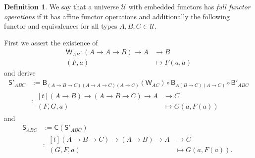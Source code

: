 \documentclass[a4paper]{article}
\theoremstyle{definition}
\newtheorem{definition}{Definition}[section]
\theoremstyle{remark}
\newcommand{\defn}{\emph}
\newcommand{\U}{\mathcal{U}}
\newcommand{\nm}{\mathsf}
\newcommand{\combinator}{\nm}
\newcommand{\compFun}{\combinator{B'}}
\newcommand{\revCompFun}{\combinator{B}}
\newcommand{\swapFun}{\combinator{C}}
\newcommand{\dupFun}{\combinator{W}}
\newcommand{\substFun}{\combinator{S'}}
\newcommand{\revSubstFun}{\combinator{S}}
\begin{document}
\begin{definition}
  We say that a universe $\U$ with embedded functors has \defn{full functor
  operations} if it has affine functor operations and additionally the following functor
  and equivalences for all types $A,B,C \in \U.$

  First we assert the existence of
  \begin{align*}
    \dupFun_{AB} : (A \to A \to B) \to A &\to     B\\
                   (F,a)                 &\mapsto F(a,a)
  \end{align*}
  and derive
  \begin{align*}
    \substFun_{ABC} &:= \revCompFun_{(A{\to}B{\to}C)(A{\to}A{\to}C)(A{\to}C)}(\dupFun_{AC}) \circ
                        \revCompFun_{A(B{\to}C)(A{\to}C)} \circ
                        \compFun_{ABC}\\
                    &: \begin{aligned}[t]
                         (A \to B) \to (A \to B \to C) \to A &\to     C\\
                         (F,G,a)                             &\mapsto G(a,F(a))
                       \end{aligned}
  \end{align*}
  and
  \begin{align*}
    \revSubstFun_{ABC} &:= \swapFun(\substFun_{ABC})\\
                       &: \begin{aligned}[t]
                            (A \to B \to C) \to (A \to B) \to A &\to     C\\
                            (G,F,a)                             &\mapsto G(a,F(a)).
                          \end{aligned}
  \end{align*}


\end{definition}
\end{document}
